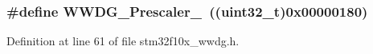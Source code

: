 \subsubsection[{\texorpdfstring{W\+W\+D\+G\+\_\+\+Prescaler\+\_\+8}{WWDG_Prescaler_8}}]{\setlength{\rightskip}{0pt plus 5cm}\#define W\+W\+D\+G\+\_\+\+Prescaler\+\_~(({\bf uint32\+\_\+t})0x00000180)}\hypertarget{group___w_w_d_g___prescaler_ga7a4933366603869726bd5ea547d99f02}{}\label{group___w_w_d_g___prescaler_ga7a4933366603869726bd5ea547d99f02}


Definition at line 61 of file stm32f10x\+\_\+wwdg.\+h.

